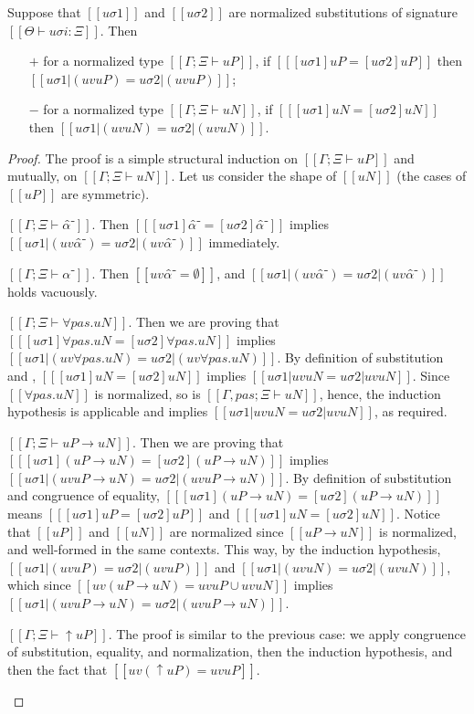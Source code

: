 \begin{lemma}
  \label{lemma:subst-eq-algovar}
  Suppose that $[[uσ1]]$ and $[[uσ2]]$ are 
  normalized substitutions of signature $[[Θ ⊢ uσi : Ξ]]$.
  Then 
  \begin{enumerate}
    \item [$+$] for a normalized type $[[Γ; Ξ ⊢ uP]]$, if $[[ [uσ1]uP = [uσ2]uP ]]$ then
      $[[uσ1|(uv uP)  = uσ2|(uv uP)]]$;
    \item [$-$] for a normalized type $[[Γ; Ξ ⊢ uN]]$, if $[[ [uσ1]uN = [uσ2]uN ]]$ then
      $[[uσ1|(uv uN)  = uσ2|(uv uN)]]$.
  \end{enumerate}
\end{lemma}
\begin{proof}
  The proof is a simple structural induction on 
  $[[Γ; Ξ ⊢ uP]]$ and mutually, on $[[Γ; Ξ ⊢ uN]]$.
  Let us consider the shape of $[[uN]]$ (the cases of $[[uP]]$ are symmetric).
  \begin{caseof}
    \item $[[Γ; Ξ ⊢ α̂⁻]]$. Then $[[ [uσ1]α̂⁻ = [uσ2]α̂⁻ ]]$
      implies $[[uσ1|(uv α̂⁻) = uσ2|(uv α̂⁻)]]$ immediately.
    \item $[[Γ; Ξ ⊢ α⁻]]$. Then $[[uv α̂⁻ = ∅]]$, and
      $[[uσ1|(uv α̂⁻)  = uσ2|(uv α̂⁻)]]$ holds vacuously.
    \item $[[Γ; Ξ ⊢ ∀pas.uN]]$. Then we are proving that
      $[[ [uσ1]∀pas.uN = [uσ2]∀pas.uN ]]$ implies $[[uσ1|(uv ∀pas.uN) = uσ2|(uv ∀pas.uN)]]$.
      By definition of substitution and , 
      $[[ [uσ1]uN = [uσ2]uN ]]$ implies $[[uσ1|uv uN = uσ2|uv uN]]$.
      Since $[[∀pas.uN]]$ is normalized, so is $[[Γ, pas; Ξ ⊢ uN]]$, 
      hence, the induction hypothesis is applicable and implies $[[uσ1|uv uN = uσ2|uv uN]]$,
      as required.
    \item $[[Γ; Ξ ⊢ uP → uN]]$. Then we are proving that
      $[[ [uσ1](uP → uN) = [uσ2](uP → uN) ]]$ implies $[[uσ1|(uv uP → uN) = uσ2|(uv uP → uN)]]$.
      By definition of substitution and congruence of equality, 
      $[[ [uσ1](uP → uN) = [uσ2](uP → uN) ]]$
      means $[[ [uσ1]uP = [uσ2]uP ]]$ and $[[ [uσ1]uN = [uσ2]uN ]]$.
      Notice that $[[uP]]$ and $[[uN]]$ are normalized since $[[uP → uN]]$ is normalized, 
      and well-formed in the same contexts.
      This way, by the induction hypothesis, 
      $[[uσ1|(uv uP) = uσ2|(uv uP)]]$ and $[[uσ1|(uv uN) = uσ2|(uv uN)]]$,
      which since $[[uv (uP → uN) = uv uP ∪ uv uN]]$ implies
      $[[uσ1|(uv uP → uN) = uσ2|(uv uP → uN)]]$.
    \item $[[Γ; Ξ ⊢ ↑uP]]$. The proof is similar to the previous case:
      we apply congruence of substitution, equality, and normalization,
      then the induction hypothesis, and then the fact that $[[uv (↑uP) = uv uP]]$.
  \end{caseof}
\end{proof}


